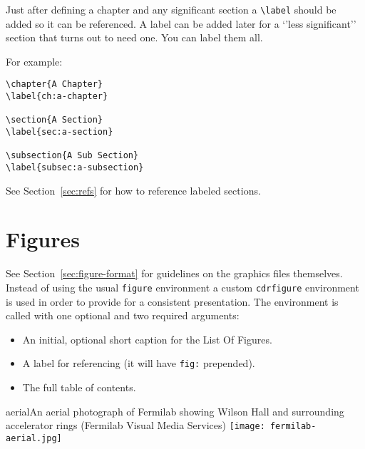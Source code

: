 Just after defining a chapter and any significant section a
\verb|\label| should be added so it can be referenced.
A label can be added later for a `'less significant'' section that
turns out to need one. You can label them all. 

For example:

\begin{verbatim}
\chapter{A Chapter}
\label{ch:a-chapter}

\section{A Section}
\label{sec:a-section}

\subsection{A Sub Section}
\label{subsec:a-subsection}
\end{verbatim}

See Section~\ref{sec:refs} for how to reference labeled sections.

\section{Figures}
\label{sec:figures}

See Section~\ref{sec:figure-format} for guidelines on the graphics files themselves.
Instead of using the usual \texttt{figure} environment a custom \texttt{cdrfigure}
environment is used in order to provide for a consistent presentation.
The environment is called with one optional and two required
arguments:

\begin{itemize}
\item An initial, optional short caption for the List Of Figures.
\item A label for referencing (it will have \texttt{fig:} prepended).
\item The full table of contents.
\end{itemize}

\begin{cdrfigure}{aerial}{An aerial photograph of Fermilab
    showing Wilson Hall and surrounding accelerator rings (Fermilab
    Visual Media Services)}
  \texttt{[image: fermilab-aerial.jpg]}
\end{cdrfigure}


